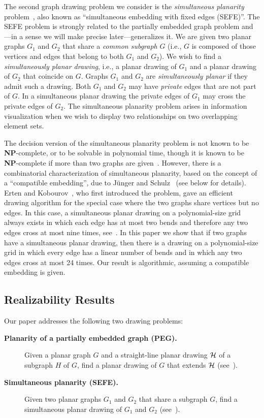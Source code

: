 \documentclass{llncs}
\newcommand{\NP}{\mbox{\bfseries NP}}
\begin{document}
The second graph drawing problem we consider is the \emph{simultaneous planarity} problem~\cite{BKR?}, also known as ``simultaneous embedding with fixed edges (SEFE)''.  The SEFE problem is strongly related to the partially embedded graph problem and---in a sense we will make precise later---generalizes it. We are given two planar graphs $G_1$ and $G_2$ that share a \emph{common subgraph} $G$ (i.e., $G$ is composed of those vertices and edges that belong to both $G_1$ and $G_2$). We wish to find a \emph{simultaneously planar drawing}, i.e., a planar drawing of $G_1$ and a planar drawing of $G_2$ that coincide on $G$. Graphs $G_1$ and $G_2$ are \emph{simultaneously planar} if they admit such a drawing. Both $G_1$ and $G_2$ may have {\em private} edges that are not part of $G$. In a simultaneous planar drawing the private edges of $G_1$ may cross the private edges of $G_2$. The simultaneous planarity problem arises in information visualization when we wish to display two relationships on two overlapping element sets.

The decision version of the simultaneous planarity problem is not known to be \NP-complete, or to be solvable in polynomial time, though it is known to be \NP-complete if more than two graphs are given~\cite{GJPSS06}. However, there is a combinatorial characterization of simultaneous planarity, based on the concept of a ``compatible embedding'', due to J{\"u}nger and Schulz~\cite{JS} (see below for details). Erten and Kobourov~\cite{EK}, who first introduced the problem, gave an efficient drawing algorithm for the special case where the two graphs share vertices but no edges.  In this case, a simultaneous planar drawing on a polynomial-size grid always exists in which each edge has at most two bends and therefore any two edges cross at most nine times, see~\cite{dl-seogpc-07,EK,k-setbepa-06}. In this paper we show that if two graphs have a simultaneous planar drawing, then there is a drawing on a polynomial-size grid in which every edge has a linear number of bends and in which any two edges cross at most 24 times. Our result is algorithmic, assuming a compatible embedding is given.

\subsection{Realizability Results}

Our paper addresses the following two drawing problems:

\begin{description}

\item[{\bf Planarity of a partially embedded graph (PEG).}]
Given a planar graph $G$ and a straight-line planar drawing ${\cal H}$ of a subgraph $H$ of $G$,
find a planar drawing of $G$ that extends ${\cal H}$ (see~\cite{ABFJKPR10,JKR13}).


\item[{\bf Simultaneous planarity (SEFE).}]
Given two planar graphs $G_1$ and $G_2$ that share a subgraph $G$,
find a simultaneous planar drawing of $G_1$ and $G_2$ (see~\cite{BKR?}).
\end{description}
\end{document}
